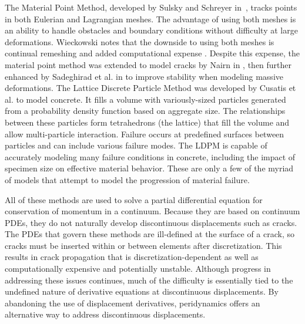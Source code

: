 The Material Point Method, developed by Sulsky and Schreyer in~\cite{sulsky1996axisymmetric}, tracks points in both Eulerian and Lagrangian meshes.
The advantage of using both meshes is an ability to handle obstacles and boundary conditions without difficulty at large deformations.
Wieckowski notes that the downside to using both meshes is continual remeshing and added computational expense \cite{wikeckowski2004material}.
Despite this expense, the material point method was extended to model cracks by Nairn in \cite{nairn2003material}, then further enhanced by Sadeghirad et al. in \cite{sadeghirad2011convected} to improve stability when modeling massive deformations.
The Lattice Discrete Particle Method was developed by Cusatis et al.\cite{cusatis2011lattice,cusatis2011blattice} to model concrete.
It fills a volume with variously-sized particles generated from a probability density function based on aggregate size.
The relationships between these particles form tetrahedrons (the lattice) that fill the volume and allow multi-particle interaction.
Failure occurs at predefined surfaces between particles and can include various failure modes.
The LDPM is capable of accurately modeling many failure conditions in concrete, including the impact of specimen size on effective material behavior.
These are only a few of the myriad of models that attempt to model the progression of material failure.

All of these methods are used to solve a partial differential equation for conservation of momentum in a continuum. 
Because they are based on continuum PDEs, they do not naturally develop discontinuous displacements such as cracks. 
The PDEs that govern these methods are ill-defined at the surface of a crack, so cracks must be inserted within or between elements after discretization. 
This results in crack propagation that is discretization-dependent as well as computationally expensive and potentially unstable. 
Although progress in addressing these issues continues, much of the difficulty is essentially tied to the undefined nature of derivative equations at discontinuous displacements.
By abandoning the use of displacement derivatives, peridynamics offers an alternative way to address discontinuous displacements.
%

